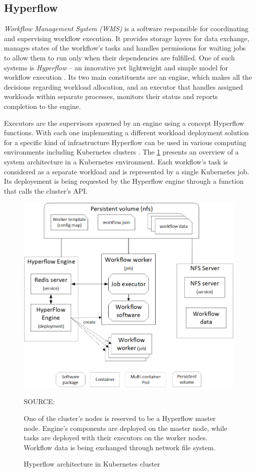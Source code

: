 \subsection{Hyperflow}
\label{s:ProblemDomain:Hyperflow}

\emph{Workflow Management System (WMS)} is a software responsible for coordinating and supervising workflow execution.
It provides storage layers for data exchange, manages states of the workflow's tasks and handles permissions for waiting jobs to allow them to run only when their dependencies are fulfilled.
One of such systems is \emph{Hyperflow} -- an innovative yet lightweight and simple model for workflow execution \cite{b:Hyperflow}.
Its two main constituents are an engine, which makes all the decisions regarding workload allocation, and an executor that handles assigned workloads within separate processes, monitors their status and reports completion to the engine.


Executors are the supervisors spawned by an engine using a concept Hyperflow functions.
With each one implementing a different workload deployment solution for a specific kind of infrastructure Hyperflow can be used in various computing environments including Kubernetes clusters \cite{b:Hyperflow-k8s-deployment}.
The \cref{fig:hyperflow:architecture} presents an overview of a system architecture in a Kubernetes environment.
Each workflow's task is considered as a separate workload and is represented by a single Kubernetes job.
Its deployement is being requested by the Hyperflow engine through a function that calls the cluster's API.


\begin{figure}[H]
\centering
\includegraphics[width=0.6\linewidth]{figures/2-4-hyperflow-k8s-arch.png}
\caption{Hyperflow architecture in Kubernetes cluster}

\smallskip
\begin{minipage}{0.7\textwidth}
{\footnotesize\centering
SOURCE: \cite{b:Hyperflow-k8s-deployment}
\par}
\smallskip
{\footnotesize
One of the cluster's nodes is reserved to be a Hyperflow master node.
Engine's components are deployed on the master node, while tasks are deployed with their executors on the worker nodes.
Workflow data is being exchanged through network file system.
\par}
\end{minipage}

\label{fig:hyperflow:architecture}
\end{figure}

